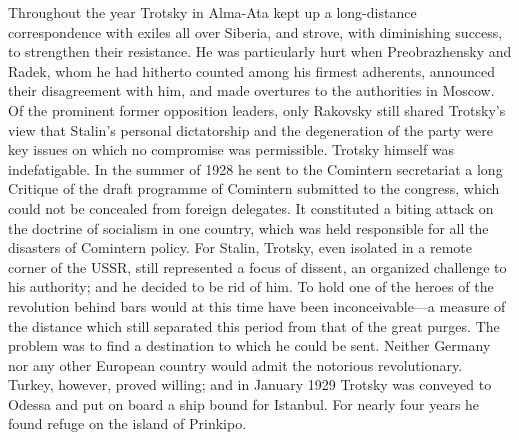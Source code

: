 Throughout the year Trotsky in Alma-Ata kept up a long-distance correspondence with exiles all over Siberia, and strove, with diminishing success, to strengthen their resistance. He was particularly hurt when Preobrazhensky and Radek, whom he had hitherto counted among his firmest adherents, announced their disagreement with him, and made overtures to the authorities in Moscow. Of the prominent former opposition leaders, only Rakovsky still shared Trotsky's view that Stalin's personal dictatorship and the degeneration of the party were key issues on which no compromise was permissible. Trotsky himself was indefatigable. In the summer of 1928 he sent to the Comintern secretariat a long Critique of the draft programme of Comintern submitted to the congress, which could not be concealed from foreign delegates. It constituted a biting attack on the doctrine of socialism in one country, which was held responsible for all the disasters of Comintern policy. For Stalin, Trotsky, even isolated in a remote corner of the USSR, still represented a focus of dissent, an organized challenge to his authority; and he decided to be rid of him. To hold one of the heroes of the revolution behind bars would at this time have been inconceivable---a measure of the distance which still separated this period from that of the great purges. The problem was to find a destination to which he could be sent. Neither Germany nor any other European country would admit the notorious revolutionary. Turkey, however, proved willing; and in January 1929 Trotsky was conveyed to Odessa and put on board a ship bound for Istanbul. For nearly four years he found refuge on the island of Prinkipo. 

